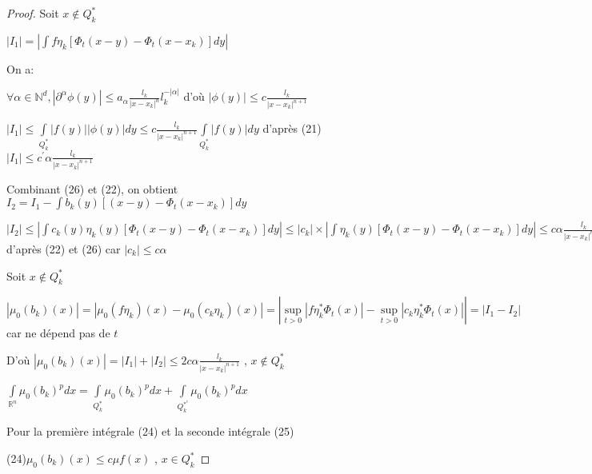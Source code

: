 \documentclass[12pt, a4paper, oneside]{article}
\begin{document}
\begin{proof}
	Soit $x\notin Q_{k}^{\ast }$
	
	$\left\vert I_{1}\right\vert =\left\vert \int f\eta _{k}[\Phi
	_{t}(x-y)-\Phi _{t}(x-x_{k})]dy\right\vert $
	
	On a: 
	
	$\forall \alpha \in \mathbb{N}^{d},\left\vert \partial ^{\alpha }\phi (y)\right\vert \leq a_{\alpha }
	\frac{l_{k}}{\left\vert x-x_{k}\right\vert ^{n}}l_{k}^{-\left\vert \alpha
		\right\vert }$ d'où $\left\vert \phi (y)\right\vert \leq c\frac{l_{k}}{
		\left\vert x-x_{k}\right\vert ^{n+1}}$
	
	$\left\vert I_{1}\right\vert \leq \int\limits_{Q_{k}^{\ast }}\left\vert
	f(y)\right\vert \left\vert \phi (y)\right\vert dy\leq c\frac{l_{k}}{
		\left\vert x-x_{k}\right\vert ^{n+1}}\int\limits_{Q_{k}^{\ast }}\left\vert
	f(y)\right\vert dy$ d'après (21) $\left\vert I_{1}\right\vert \leq
	c^{\prime }\alpha \frac{l_{k}}{\left\vert x-x_{k}\right\vert ^{n+1}}$
	
	Combinant (26) et (22), on obtient $I_{2}=I_{1}-\int b_{k}(y)[(x-y)-\Phi
	_{t}(x-x_{k})]dy$
	
	$\left\vert I_{2}\right\vert \leq \left\vert \int c_{k}(y)\eta _{k}(y)[\Phi
	_{t}(x-y)-\Phi _{t}(x-x_{k})]dy\right\vert \leq \left\vert c_{k}\right\vert
	\times \left\vert \int \eta _{k}(y)[\Phi _{t}(x-y)-\Phi
	_{t}(x-x_{k})]dy\right\vert \leq c\alpha \frac{l_{k}}{\left\vert
		x-x_{k}\right\vert ^{n+1}}$ d'après (22) et (26) car $\left\vert
	c_{k}\right\vert \leq c\alpha $
	
	Soit $x\notin Q_{k}^{\ast }$
	
	$\left\vert \mu _{0}(b_{k})(x)\right\vert =\left\vert \mu _{0}(f\eta
	_{k})(x)-\mu _{0}(c_{k}\eta _{k})(x)\right\vert =\left\vert \underset{t>0}{
		\sup }\left\vert f\eta _{k}^{\ast }\Phi _{t}(x)\right\vert -\underset{t>0}{
		\sup }\left\vert c_{k}\eta _{k}^{\ast }\Phi _{t}(x)\right\vert \right\vert
	=\left\vert I_{1}-I_{2}\right\vert $ car ne dépend pas de $t$
	
	D'où $\left\vert \mu _{0}(b_{k})(x)\right\vert =\left\vert
	I_{1}\right\vert +\left\vert I_{2}\right\vert \leq 2c\alpha \frac{l_{k}}{
		\left\vert x-x_{k}\right\vert ^{n+1}}$ , $x\notin Q_{k}^{\ast }$
	
	$\int\limits_{\mathbb{R}^{n}}\mu _{0}(b_{k})^{p}dx=\int\limits_{Q_{k}^{\ast }}\mu_{0}(b_{k})^{p}dx+\int\limits_{Q_{k}^{\ast ^{c}}}\mu _{0}(b_{k})^{p}dx$
	
	Pour la première intégrale (24) et la seconde intégrale (25)
	
	(24)$\mu _{0}(b_{k})(x)\leq c\mu f(x)$ , $x\in Q_{k}^{\ast }$
	

\end{proof}
\end{document}
